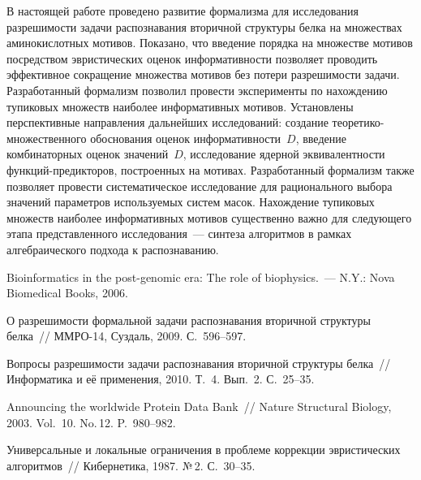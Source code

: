 \begin{multicols}{2}
В настоящей работе проведено развитие формализма для исследования
разрешимости задачи распознавания вторичной структуры белка на
множествах аминокислотных мотивов. Показано, что введение порядка на
множестве мотивов посредством эвристических оценок информативности
позволяет проводить эффективное сокращение множества мотивов без
потери разрешимости задачи. Разработанный формализм позволил провести
эксперименты по нахождению тупиковых множеств наиболее
информативных мотивов. Установлены перспективные направления
дальнейших исследований: создание тео\-ре\-ти\-ко-мно\-же\-ст\-вен\-но\-го
обосно\-ва\-ния оценок информативности~$D$, введение комбинаторных
оценок значений~$D$, исследование ядерной эквивалентности функ\-ций-пре\-дик\-то\-ров,
построенных на мотивах. Разработанный формализм также
позволяет провести систематическое исследование для рационального
выбора значений параметров используемых систем масок. Нахождение
тупиковых множеств наиболее информативных мотивов существенно важно
для следу\-юще\-го этапа представленного исследования~--- синтеза алгоритмов
в рамках алгебраического подхода к распознаванию.

\vspace*{-12pt}

{\small\frenchspacing
{%
\begin{thebibliography}{9}

Bioinformatics in the post-genomic era: The role of biophysics.~--- N.Y.: Nova
Biomedical Books, 2006.

О разрешимости формальной задачи распознавания вторичной структуры
белка~// ММРО-14, Суздаль, 2009. С.~596--597.

Вопросы разрешимости задачи распознавания вторичной структуры белка~//
Информатика и её применения, 2010. Т.~4. Вып.~2. С.~25--35.

Announcing the worldwide Protein Data Bank~// Nature Structural Biology, 2003.
Vol.~10. No.\,12. P.~980--982.


Универсальные и локальные ограничения в проблеме коррекции
эвристических алгоритмов~// Кибернетика, 1987. №\,2. С.~30--35.


\end{thebibliography}}}
\end{multicols}
